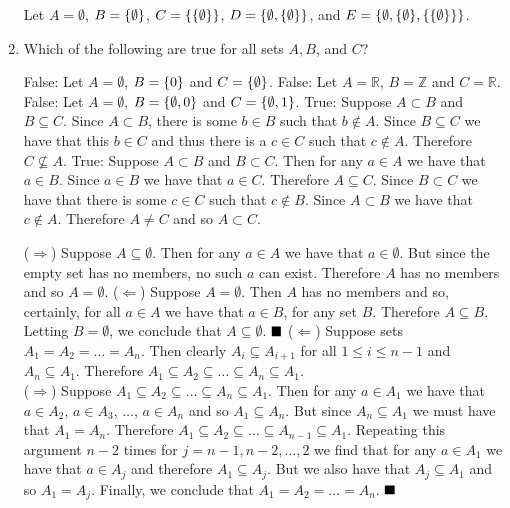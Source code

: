 \documentclass[12pt]{book}
\begin{document}
\begin{enumerate}
{Let $A = \emptyset$, $B = \set{\emptyset}$, $C = \set{\set{\emptyset}}$, $D = \set{\emptyset, \set{\emptyset}}$, and $E = \set{\emptyset, \set{\emptyset}, \set{\set{\emptyset}}}$.}
\item Which of the following are true for all sets $A, B$, and $C$?
	\begin{enumerate}
	{False: Let $A = \emptyset$, $B = \set{0}$ and $C = \set{\emptyset}$.}
	{False: Let $A = \mathbb{R}$, $B = \mathbb{Z}$ and $C = \mathbb{R}$.}
	{False: Let $A = \emptyset$, $B = \set{\emptyset, 0}$ and $C = \set{\emptyset, 1}$.}
	{True: Suppose $A \subset B$ and $B \subseteq C$. Since $A \subset B$, there is some $b \in B$ such that $b \notin A$. Since $B \subseteq C$ we have that this $b \in C$ and thus there is a $c \in C$ such that $c \notin A$. Therefore $C \not\subseteq A$.}
	{True: Suppose $A \subset B$ and $B \subset C$. Then for any $a \in A$ we have that $a \in B$. Since $a \in B$ we have that $a \in C$. Therefore $A \subseteq C$. Since $B \subset C$ we have that there is some $c \in C$ such that $c \notin B$. Since $A \subset B$ we have that $c \notin A$. Therefore $A \neq C$ and so $A \subset C$.}
	\end{enumerate}
{($\Rightarrow$) Suppose $A \subseteq \emptyset$. Then for any $a \in A$ we have that $a \in \emptyset$. But since the empty set has no members, no such $a$ can exist. Therefore $A$ has no members and so $A = \emptyset$. ($\Leftarrow$) Suppose $A = \emptyset$. Then $A$ has no members and so, certainly, for all $a \in A$ we have that $a \in B$, for any set $B$. Therefore $A \subseteq B$. Letting $B = \emptyset$, we conclude that $A \subseteq \emptyset$. $\qed$}
{($\Leftarrow$) Suppose sets $A_1 = A_2 = \dots = A_n$. Then clearly $A_i \subseteq A_{i+1}$ for all $1 \leq i \leq n - 1$ and $A_n \subseteq A_1$. Therefore $A_1 \subseteq A_2 \subseteq \dots \subseteq A_n \subseteq A_1$.\\ ($\Rightarrow$) Suppose $A_1 \subseteq A_2 \subseteq \dots \subseteq A_n \subseteq A_1$. Then for any $a \in A_1$ we have that $a \in A_2$, $a \in A_3$, $\dots$, $a \in A_n$ and so $A_1 \subseteq A_n$. But since $A_n \subseteq A_1$ we must have that $A_1 = A_n$. Therefore $A_1 \subseteq A_2 \subseteq \dots \subseteq A_{n-1} \subseteq A_1$. Repeating this argument $n - 2$ times for $j = n - 1, n - 2, \dots, 2$ we find that for any $a \in A_1$ we have that $a \in A_j$ and therefore $A_1 \subseteq A_j$. But we also have that $A_j \subseteq A_1$ and so $A_1 = A_j$. Finally, we conclude that $A_1 = A_2 = \dots = A_n$. $\qed$}

\end{enumerate}
\end{document}
